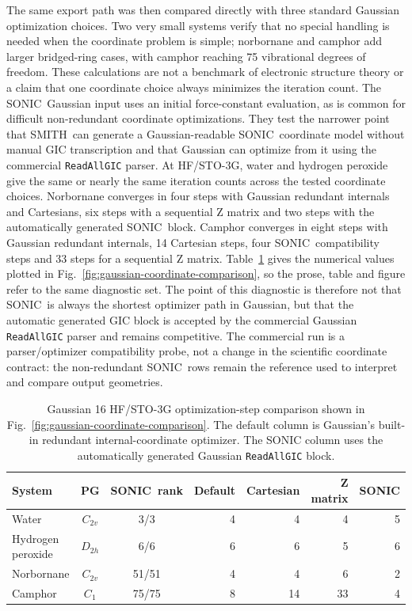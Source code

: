 \documentclass[journal=jctcce,manuscript=article,layout=traditional]{achemso}
\newcommand{\SONIC}{SONIC}
\newcommand{\SMITH}{\textsc{SMITH}}
\theoremstyle{definition}
\begin{document}
The same export path was then compared directly with three standard Gaussian
optimization choices.  Two very small systems verify that no special handling
is needed when the coordinate problem is simple; norbornane and camphor add
larger bridged-ring cases, with camphor reaching 75 vibrational degrees of
freedom.  These calculations
are not a benchmark of electronic
structure theory or a claim that one coordinate choice always minimizes the
iteration count.  The \SONIC\ Gaussian input uses an initial force-constant
evaluation, as is common for difficult non-redundant coordinate optimizations.
They test the narrower point that \SMITH\ can generate a
Gaussian-readable \SONIC\ coordinate model without manual GIC transcription and
that Gaussian can optimize from it using the commercial \texttt{ReadAllGIC}
parser.  At HF/STO-3G, water and hydrogen peroxide give the same or nearly the
same iteration counts across the tested coordinate choices.  Norbornane
converges in four steps with Gaussian redundant internals and Cartesians, six
steps with a sequential Z matrix and two steps with the automatically
generated \SONIC\ block.  Camphor converges in eight steps with Gaussian
redundant internals, 14 Cartesian steps, four \SONIC\ compatibility steps and 33 steps for a
sequential Z matrix.  Table~\ref{tab:gaussian-coordinate-comparison} gives the
numerical values plotted in Fig.~\ref{fig:gaussian-coordinate-comparison}, so
the prose, table and figure refer to the same diagnostic set.  The point of this
diagnostic is therefore not that
\SONIC\ is always the shortest optimizer path in Gaussian, but that the
automatic generated GIC block is accepted by the commercial Gaussian
\texttt{ReadAllGIC} parser and remains competitive.  The commercial run is a
parser/optimizer compatibility probe, not a change in the scientific coordinate
contract: the non-redundant \SONIC\ rows remain the reference used to interpret
and compare output geometries.

\begin{table}[htbp]
\centering
\caption{Gaussian 16 HF/STO-3G optimization-step comparison shown in
Fig.~\ref{fig:gaussian-coordinate-comparison}.  The default column is Gaussian's
built-in redundant internal-coordinate optimizer.  The \SONIC{} column uses the
automatically generated Gaussian \texttt{ReadAllGIC} block.}
\label{tab:gaussian-coordinate-comparison}
\begin{tabular}{lccrrrr}
\toprule
System & PG & \SONIC\ rank & Default & Cartesian & Z matrix & \SONIC \\
\midrule
Water & \(C_{2v}\) & 3/3 & 4 & 4 & 4 & 5 \\
Hydrogen peroxide & \(D_{2h}\) & 6/6 & 6 & 6 & 5 & 6 \\
Norbornane & \(C_{2v}\) & 51/51 & 4 & 4 & 6 & 2 \\
Camphor & \(C_1\) & 75/75 & 8 & 14 & 33 & 4 \\
\bottomrule
\end{tabular}
\end{table}
\end{document}
